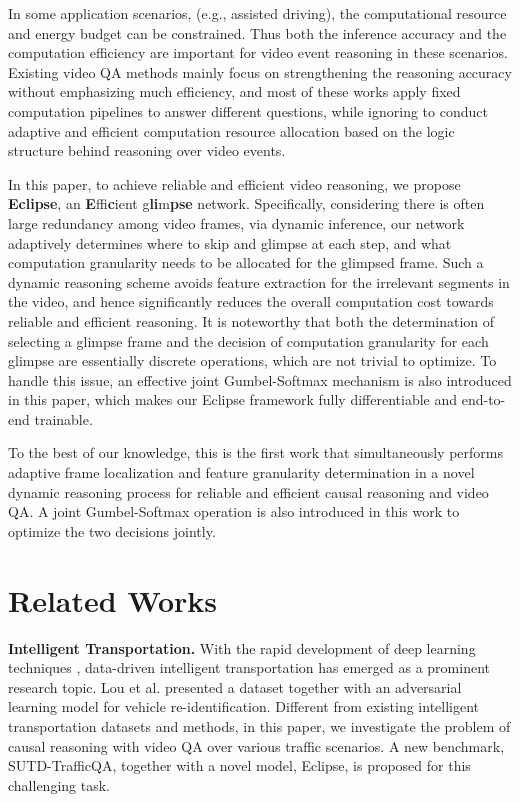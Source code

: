 \documentclass[final]{cvpr}
\begin{document}
In some application scenarios, (e.g., assisted driving), the computational resource and energy budget can be constrained.
Thus 
both the inference accuracy and the computation efficiency are important for video event reasoning in these scenarios.
Existing video QA methods \cite{Kim_2020_CVPR,Le_2020_CVPR,lei-etal-2020-tvqa} mainly focus on strengthening the reasoning accuracy without emphasizing much efficiency, and most of
these works apply fixed computation pipelines 
to answer different questions, while ignoring to conduct adaptive and efficient computation resource allocation based on the logic structure behind reasoning over video events. 




In this paper, to achieve reliable and efficient video reasoning, we propose \textbf{Eclipse}, an \textbf{E}ffi\textbf{c}ient g\textbf{li}m\textbf{pse} network.
Specifically, considering there is often large redundancy among video frames, via dynamic inference, our network adaptively determines where to skip and glimpse at each step, and what computation granularity needs to be allocated for the glimpsed frame. Such a dynamic reasoning scheme avoids feature extraction for the irrelevant segments in the video, and hence significantly reduces the overall computation cost towards 
reliable and efficient reasoning.
It is noteworthy that both the determination of selecting a glimpse frame and the decision of computation granularity for each glimpse are essentially discrete operations, which are 
not trivial to optimize. To handle this issue, an effective joint Gumbel-Softmax mechanism is also introduced in this paper, which makes our Eclipse framework fully differentiable and end-to-end trainable. 

To the best of our knowledge, this is the first work that simultaneously performs adaptive frame localization and feature granularity determination in a novel dynamic reasoning process for reliable and efficient causal reasoning and video QA. A joint Gumbel-Softmax operation is also introduced in this work to optimize the two decisions jointly.




\section{Related Works}
\textbf{Intelligent Transportation.} 
With the rapid development of deep learning techniques \cite{krizhevsky2012imagenet, ren2015faster, vaswani2017attention}, data-driven intelligent transportation \cite{chandra2020forecasting,lou2019veri,you2020traffic,chandra2020forecasting} has emerged as a prominent research topic.
Lou et al. \cite{lou2019veri} presented a dataset together with an adversarial learning model for vehicle re-identification.
Different from existing intelligent transportation datasets and methods,
in this paper, we investigate the problem of causal reasoning with video QA over various traffic scenarios. A new benchmark, SUTD-TrafficQA, together with a novel model, Eclipse, is proposed for this challenging task.
\end{document}
